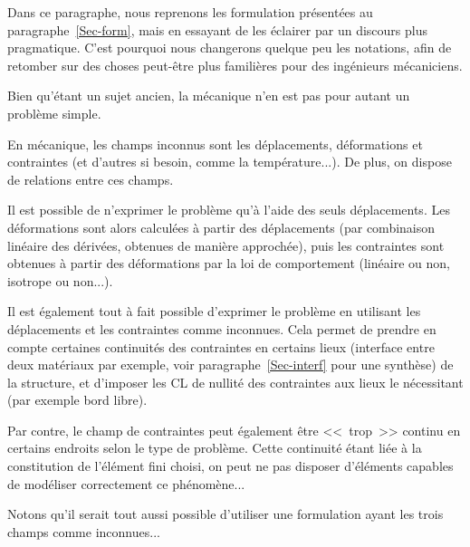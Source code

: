 Dans ce paragraphe, nous reprenons les formulation présentées au paragraphe~\ref{Sec-form},
mais en essayant de les éclairer par un discours plus pragmatique. C'est pourquoi nous
changerons quelque peu les notations, afin de retomber sur des choses peut-être plus familières
pour des ingénieurs mécaniciens.

\medskip
Bien qu'étant un sujet ancien, la mécanique n'en est pas pour autant un problème simple.

En mécanique, les champs inconnus sont les déplacements, déformations
et contraintes (et d'autres si besoin, comme la température...).
De plus, on dispose de relations entre ces champs.

\medskip
Il est possible de n'exprimer le problème qu'à l'aide des seuls déplacements.
Les déformations sont alors calculées à partir des déplacements (par combinaison
linéaire des dérivées, obtenues de manière approchée), puis les contraintes
sont obtenues à partir des déformations par la loi de comportement (linéaire ou non,
isotrope ou non...).

\medskip
Il est également tout à fait possible d'exprimer le problème en
utilisant les déplacements et les contraintes comme inconnues.
Cela permet de prendre en compte certaines continuités des contraintes en certains lieux
(interface entre deux matériaux par exemple, voir paragraphe~\ref{Sec-interf} pour une synthèse)
de la structure, et d'imposer les CL de nullité des contraintes aux lieux le nécessitant (par exemple bord libre).

Par contre, le champ de contraintes peut également être <<~trop~>> continu
en certains endroits selon le type de problème. Cette continuité étant
liée à la constitution de l'élément fini choisi, on peut ne pas disposer
d'éléments capables de modéliser correctement ce phénomène...

\medskip
Notons qu'il serait tout aussi possible d'utiliser une formulation ayant les trois champs
comme inconnues...



